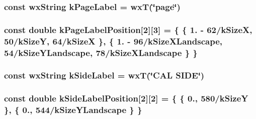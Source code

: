 \hypertarget{a00222_a5a5b744a5a5b90e2ee6ef7dcfed7e85e}{
\subsubsection[{k\-Page\-Label}]{\setlength{\rightskip}{0pt plus 5cm}const wx\-String k\-Page\-Label = wx\-T(\char`\"{}page\char`\"{})\hspace{0.3cm}{\ttfamily [static]}}}\label{a00222_a5a5b744a5a5b90e2ee6ef7dcfed7e85e}
\hypertarget{a00222_a19f1949059e2222c3bc8453e70c35e42}{
\subsubsection[{k\-Page\-Label\-Position}]{\setlength{\rightskip}{0pt plus 5cm}const double k\-Page\-Label\-Position\mbox{[}2\mbox{]}\mbox{[}3\mbox{]} = \{ \{ 1. -\/ 62/{\bf k\-Size\-X}, 50/{\bf k\-Size\-Y}, 64/{\bf k\-Size\-X} \}, \{ 1. -\/ 96/{\bf k\-Size\-X\-Landscape}, 54/{\bf k\-Size\-Y\-Landscape}, 78/{\bf k\-Size\-X\-Landscape} \} \}\hspace{0.3cm}{\ttfamily [static]}}}\label{a00222_a19f1949059e2222c3bc8453e70c35e42}
\hypertarget{a00222_af4fa611fca6edf57449089039299f8a7}{
\subsubsection[{k\-Side\-Label}]{\setlength{\rightskip}{0pt plus 5cm}const wx\-String k\-Side\-Label = wx\-T(\char`\"{}C\-A\-L S\-I\-D\-E\char`\"{})\hspace{0.3cm}{\ttfamily [static]}}}\label{a00222_af4fa611fca6edf57449089039299f8a7}
\hypertarget{a00222_a707097e4fa24a5daca2bab3e91a6a76c}{
\subsubsection[{k\-Side\-Label\-Position}]{\setlength{\rightskip}{0pt plus 5cm}const double k\-Side\-Label\-Position\mbox{[}2\mbox{]}\mbox{[}2\mbox{]} = \{ \{ 0., 580/{\bf k\-Size\-Y} \}, \{ 0., 544/{\bf k\-Size\-Y\-Landscape} \} \}\hspace{0.3cm}{\ttfamily [static]}}}\label{a00222_a707097e4fa24a5daca2bab3e91a6a76c}
